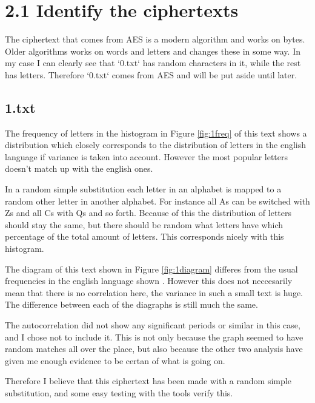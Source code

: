 \section*{2.1 Identify the ciphertexts}

The ciphertext that comes from AES is a modern algorithm and works on bytes.
Older algorithms works on words and letters and changes these in some way.
In my case I can clearly see that `0.txt` has random characters in it, while the rest has letters.
Therefore `0.txt` comes from AES and will be put aside until later.

\subsection*{1.txt}

The frequency of letters in the histogram in Figure \ref{fig:1freq} of this text shows a distribution which closely corresponds to the distribution of letters in the english language\cite{frequencies} if variance is taken into account.
However the most popular letters doesn't match up with the english ones.

In a random simple substitution each letter in an alphabet is mapped to a random other letter in another alphabet.
For instance all As can be switched with Zs and all Cs with Qs and so forth.
Because of this the distribution of letters should stay the same, but there should be random what letters have which percentage of the total amount of letters.
This corresponds nicely with this histogram.

The diagram of this text shown in Figure \ref{fig:1diagram} differes from the usual frequencies in the english language shown \cite{diagraphs}.
However this does not neccesarily mean that there is no correlation here, the variance in such a small text is huge.
The difference between each of the diagraphs is still much the same.

The autocorrelation did not show any significant periods or similar in this case, and I chose not to include it.
This is not only because the graph seemed to have random matches all over the place, but also because the other two analysis have given me enough evidence to be certan of what is going on.

Therefore I believe that this ciphertext has been made with a random simple substitution, and some easy testing with the tools verify this.

